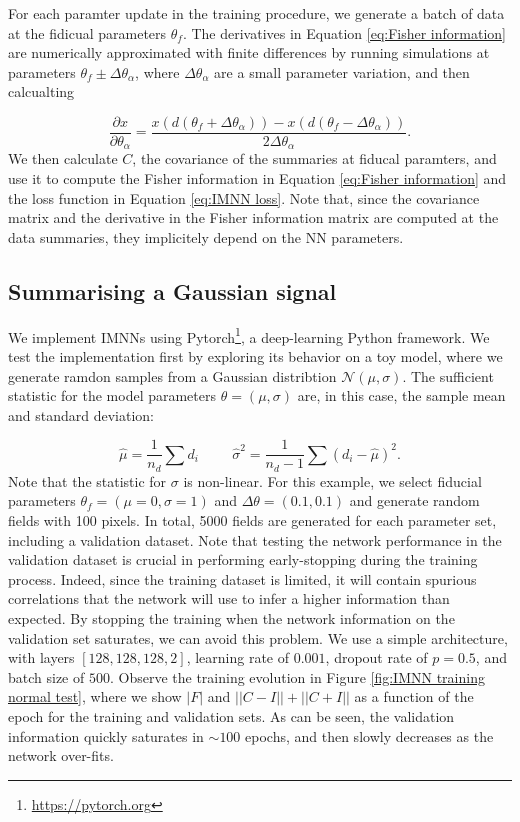 For each paramter update in the training procedure, we generate a batch of data at the fidicual parameters $\theta_f$. The derivatives in Equation \ref{eq:Fisher information} are numerically approximated with finite differences by running simulations at parameters $\theta_f \pm \Delta \theta_\alpha$, where $\Delta \theta_\alpha$ are a small parameter variation, and then calcualting

\begin{equation}
    \frac{\partial x}{\partial \theta_\alpha}=\frac{x(d(\theta_f + \Delta \theta_\alpha))-x(d(\theta_f - \Delta \theta_\alpha))}{2 \Delta \theta_\alpha}.
\end{equation}
We then calculate $C$, the covariance of the summaries at fiducal paramters, and use it to compute the Fisher information in Equation \ref{eq:Fisher information} and the loss function in Equation \ref{eq:IMNN loss}. Note that, since the covariance matrix and the derivative in the Fisher information matrix are computed at the data summaries, they implicitely depend on the NN parameters.

\subsection{Summarising a Gaussian signal}\label{sec:IMNN normal}
We implement IMNNs using Pytorch\footnote{\url{https://pytorch.org}}, a deep-learning Python framework. We test the implementation first by exploring its behavior on a toy model, where we generate ramdon samples from a Gaussian distribtion $\mathcal{N}(\mu, \sigma)$. The sufficient statistic for the model parameters $\theta=(\mu,\sigma)$ are, in this case, the sample mean and standard deviation:

\begin{equation}
    \hat{\mu}=\frac{1}{n_d}\sum d_i \hspace{1cm} \hat{\sigma}^2 = \frac{1}{n_d-1}\sum (d_i -\hat{\mu})^2.
\end{equation}
Note that the statistic for $\sigma$ is non-linear.
For this example, we select fiducial parameters $\theta_f=(\mu=0, \sigma=1)$ and $\Delta \theta=(0.1 , 0.1)$ and generate random fields with 100 pixels. In total, 5000 fields are generated for each parameter set, including a validation dataset. Note that testing the network performance in the validation dataset is crucial in performing early-stopping during the training process. Indeed, since the training dataset is limited, it will contain spurious correlations that the network will use to infer a higher information than expected. By stopping the training when the network information on the validation set saturates, we can avoid this problem. We use a simple architecture, with layers $[128,128,128,2]$, learning rate of $0.001$, dropout rate of $p=0.5$, and batch size of $500$. Observe the training evolution in Figure \ref{fig:IMNN training normal test}, where we show $|F|$ and $||C-I ||+||C+I||$ as a function of the epoch for the training and validation sets. As can be seen, the validation information quickly saturates in $\sim 100$ epochs, and then slowly decreases as the network over-fits.

